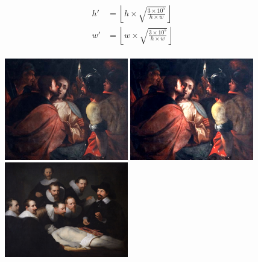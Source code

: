 \documentclass[11pt,a4paper,draft]{report}
\begin{document}
\begin{multicols}{2}
%
%

\begin{equation}
\begin{aligned}
h'  &= \left\lfloor h \times
                    \sqrt{ \frac{3 \times 10^5}{h \times w} } \right\rfloor \\
w'  &= \left\lfloor w \times
                    \sqrt{ \frac{3 \times 10^5}{h \times w} } \right\rfloor \\
\label{eq:size}
\end{aligned}
\end{equation}

\begin{figure}[tbp]
\centering
\includegraphics[width=0.48\textwidth]{nirp_caravaggio_1962_139_1}
\includegraphics[width=0.48\textwidth]{caravaggio_1962_139_1}
\includegraphics[width=0.48\textwidth]{nirp_rembrandt_eu_464}

\end{figure}
\end{multicols}
\end{document}
